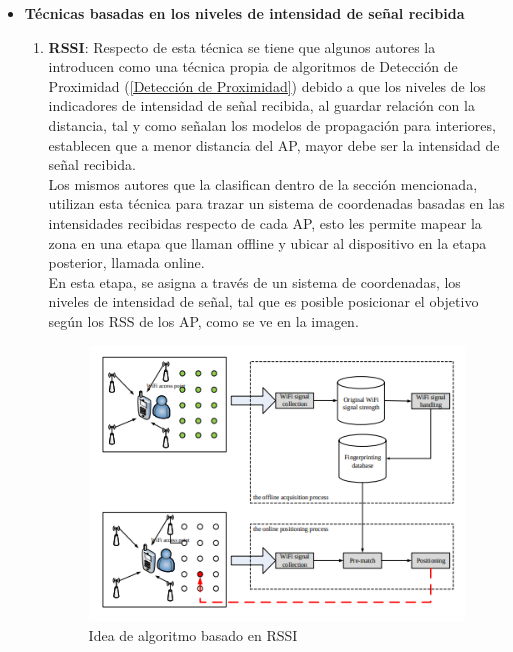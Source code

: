 \begin{itemize}
    \item{\textbf{Técnicas basadas en los niveles de intensidad de señal recibida}
    \begin{enumerate}
        \item{\textbf{\ac{RSSI}}: Respecto de esta técnica se tiene que algunos autores la introducen como una técnica propia de algoritmos de Detección de Proximidad (\ref{Detección de Proximidad}}) debido a que los niveles de los indicadores de intensidad de señal recibida, al guardar relación con la distancia, tal y como señalan los modelos de propagación para interiores, establecen que a menor distancia del AP, mayor debe ser la intensidad de señal recibida.\\
        
        Los mismos autores que la clasifican dentro de la sección mencionada, utilizan esta técnica para trazar un sistema de coordenadas basadas en las intensidades recibidas respecto de cada AP, esto les permite mapear la zona en una etapa que llaman offline y ubicar al dispositivo en la etapa posterior, llamada online.\\
            
        En esta etapa, se asigna a través de un sistema de coordenadas, los niveles de intensidad de señal, tal que es posible posicionar el objetivo según los RSS de los AP, como se ve en la imagen.
            
        \begin{figure}[h!]
            \centering
            \includegraphics[scale = 0.6]{./images/rssi}
            \caption{Idea de algoritmo basado en RSSI}
            \label{fig:RSSI}
        \end{figure}
        

\end{enumerate}}
\end{itemize}
